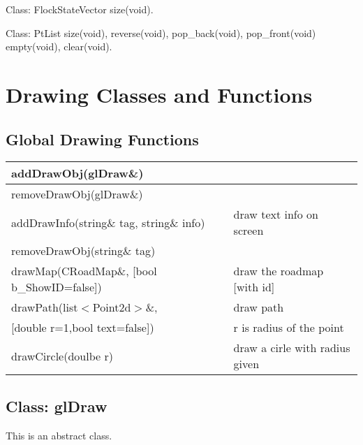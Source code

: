 \documentclass[onecolumn,10pt]{article}
\begin{document}
Class:
FlockStateVector  %
size(void).

Class:
PtList            %
size(void), reverse(void), pop\_back(void), pop\_front(void)
empty(void), clear(void).


\section{Drawing Classes and Functions}



\subsection{Global Drawing Functions}

\begin{tabular}{l|l}
addDrawObj(glDraw\&) &  \\\hline
removeDrawObj(glDraw\&) &  \\\hline

addDrawInfo(string\& tag, string\& info) & draw text info on screen \\\hline
removeDrawObj(string\& tag) & \\\hline

drawMap(CRoadMap\&, [bool b\_ShowID=false]) & draw the roadmap [with id] \\\hline

drawPath(list$<$Point2d$>$\&,                   &draw path \\
         {[}double r=1,bool text=false{]})         & r is radius of the point\\\hline 

drawCircle(doulbe r)                            &draw a cirle with radius given
\end{tabular}

\subsection{Class: glDraw}

This is an abstract class.\\
\end{document}
